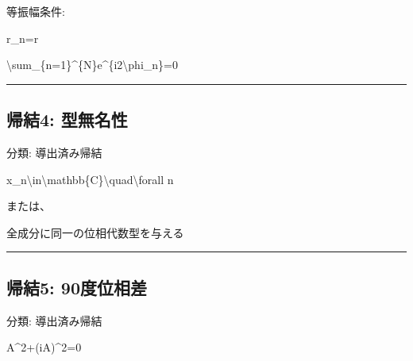 \documentclass[
  a4paper,
]{ltjsarticle}
\newenvironment{Shaded}{}{}
\newcommand{\NormalTok}[1]{#1}
\begin{document}
等振幅条件:

\begin{Shaded}
\begin{Highlighting}[]
\NormalTok{r\_n=r}
\end{Highlighting}
\end{Shaded}

\begin{Shaded}
\begin{Highlighting}[]
\NormalTok{\textbackslash{}sum\_\{n=1\}\^{}\{N\}e\^{}\{i2\textbackslash{}phi\_n\}=0}
\end{Highlighting}
\end{Shaded}

\begin{center}\rule{0.5\linewidth}{0.5pt}\end{center}

\subsection{帰結4:
型無名性}\label{ux5e30ux7d504-ux578bux7121ux540dux6027}

分類: 導出済み帰結

\begin{Shaded}
\begin{Highlighting}[]
\NormalTok{x\_n\textbackslash{}in\textbackslash{}mathbb\{C\}\textbackslash{}quad\textbackslash{}forall n}
\end{Highlighting}
\end{Shaded}

または、

\begin{Shaded}
\begin{Highlighting}[]
\NormalTok{全成分に同一の位相代数型を与える}
\end{Highlighting}
\end{Shaded}

\begin{center}\rule{0.5\linewidth}{0.5pt}\end{center}

\subsection{帰結5:
90度位相差}\label{ux5e30ux7d505-90ux5ea6ux4f4dux76f8ux5dee}

分類: 導出済み帰結

\begin{Shaded}
\begin{Highlighting}[]
\NormalTok{A\^{}2+(iA)\^{}2=0}
\end{Highlighting}
\end{Shaded}
\end{document}
